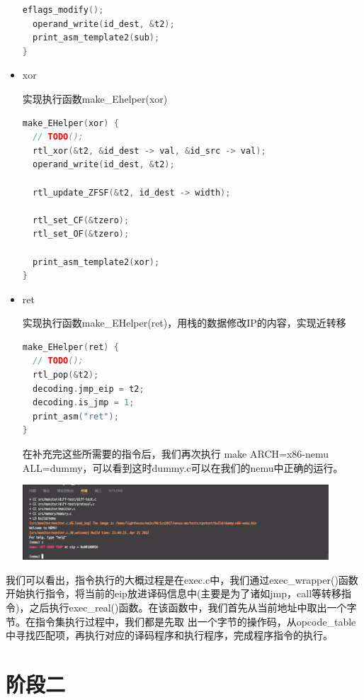 \documentclass[UTF8,a4paper,10pt]{ctexart}
\begin{document}
\begin{itemize}
\begin{lstlisting}[language = C]
  eflags_modify();
  operand_write(id_dest, &t2);
  print_asm_template2(sub);
}
\end{lstlisting}

  \item xor
  
  实现执行函数make\_Ehelper(xor)
  \begin{lstlisting}[language = C]
make_EHelper(xor) {
  // TODO();
  rtl_xor(&t2, &id_dest -> val, &id_src -> val);
  operand_write(id_dest, &t2);

  rtl_update_ZFSF(&t2, id_dest -> width);

  rtl_set_CF(&tzero);
  rtl_set_OF(&tzero);

  print_asm_template2(xor);
}
\end{lstlisting}

  \item ret
  
  实现执行函数make\_EHelper(ret)，用栈的数据修改IP的内容，实现近转移
  \begin{lstlisting}[language = C]
make_EHelper(ret) {
  // TODO();
  rtl_pop(&t2);
  decoding.jmp_eip = t2;
  decoding.is_jmp = 1;
  print_asm("ret");
}
\end{lstlisting}

在补充完这些所需要的指令后，我们再次执行 make ARCH=x86-nemu ALL=dummy，可以看到这时dummy.c可以在我们的nemu中正确的运行。
\begin{center}
\includegraphics[width=0.9\textwidth]{dummy.png}
\end{center}
\end{itemize}

我们可以看出，指令执行的大概过程是在exec.c中，我们通过exec\_wrapper()函数开始执行指令，将当前的eip放进译码信息中(主要是为了诸如jmp，call等转移指令)，之后执行exec\_real()函数。在该函数中，我们首先从当前地址中取出一个字节。在指令集执行过程中，我们都是先取 出一个字节的操作码，从opcode\_table中寻找匹配项，再执行对应的译码程序和执行程序，完成程序指令的执行。

\section{阶段二}
\end{document}
